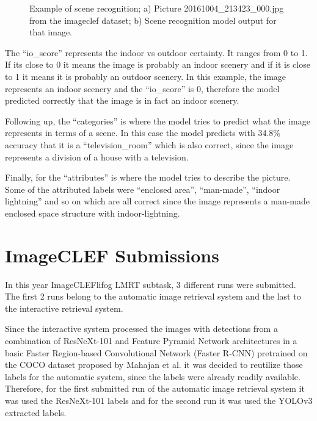 \begin{figure}[H]
\begin{subfigure}{0.4\textwidth}
    \caption{}
    \end{subfigure}
    
    \caption[Example of scene recognition]{Example of scene recognition; a) Picture 20161004\_213423\_000.jpg from the imageclef dataset; b) Scene recognition model output for that image.}

    \label{fig:imagea}
    \end{figure}


    The \enquote{io\_score} represents the indoor vs outdoor certainty. It ranges from 0 to 1. If its close to 0 it means the image is probably an indoor scenery and if it is close to 1 it means it is probably an outdoor scenery. In this example, the image represents an indoor scenery and the \enquote{io\_score} is 0, therefore the model predicted correctly that the image is in fact an indoor scenery.

    Following up, the \enquote{categories} is where the model tries to predict what the image represents in terms of a scene. In this case the model predicts with 34.8\% accuracy that it is a \enquote{television\_room} which is also correct, since the image represents a division of a house with a television.

    Finally, for the \enquote{attributes} is where the model tries to describe the picture. Some of the attributed labels were \enquote{enclosed area}, \enquote{man-made}, \enquote{indoor lightning} and so on which are all correct since the image represents a man-made enclosed space structure with indoor-lightning.

\section{ImageCLEF Submissions}
\label{sec:runs}


    In this year ImageCLEFlifog LMRT subtask, 3 different runs were submitted. The first 2 runs belong to the automatic image retrieval system and the last to the interactive retrieval system. 
    
    Since the interactive system processed the images with detections from a combination of ResNeXt-101 and Feature Pyramid Network architectures in a basic Faster Region-based Convolutional Network (Faster R-CNN) pretrained on the COCO dataset proposed by Mahajan et al. \cite{Mahajan2018} it was decided to reutilize those labels for the automatic system, since the labels were already readily available.  Therefore, for the first submitted run of the automatic image retrieval system it was used the ResNeXt-101 labels and for the second run it was used the YOLOv3 \cite{Redmon2018} extracted labels.
    
